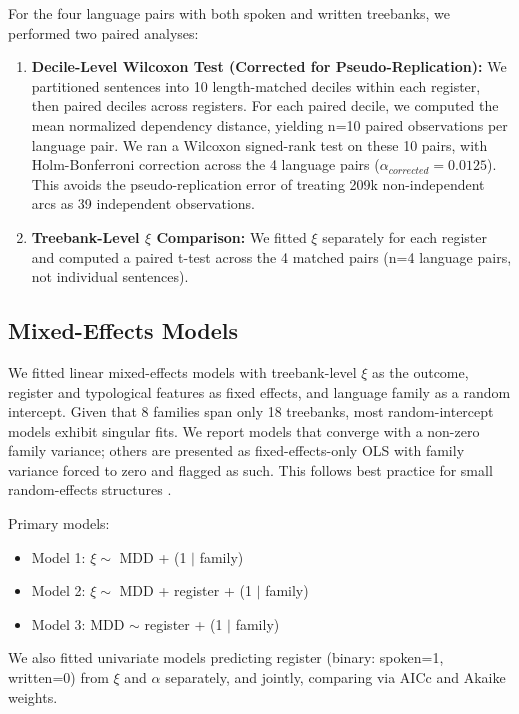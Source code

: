 \documentclass[11pt,letterpaper]{article}
\begin{document}
For the four language pairs with both spoken and written treebanks, we performed two paired analyses:

\begin{enumerate}
\item \textbf{Decile-Level Wilcoxon Test (Corrected for Pseudo-Replication):} We partitioned sentences into 10 length-matched deciles within each register, then paired deciles across registers. For each paired decile, we computed the mean normalized dependency distance, yielding n=10 paired observations per language pair. We ran a Wilcoxon signed-rank test on these 10 pairs, with Holm-Bonferroni correction across the 4 language pairs ($\alpha_{corrected}=0.0125$). This avoids the pseudo-replication error of treating 209k non-independent arcs as 39 independent observations.
\item \textbf{Treebank-Level $\xi$ Comparison:} We fitted $\xi$ separately for each register and computed a paired t-test across the 4 matched pairs (n=4 language pairs, not individual sentences).
\end{enumerate}

\subsection{Mixed-Effects Models}

We fitted linear mixed-effects models with treebank-level $\xi$ as the outcome, register and typological features as fixed effects, and language family as a random intercept. Given that 8 families span only 18 treebanks, most random-intercept models exhibit singular fits. We report models that converge with a non-zero family variance; others are presented as fixed-effects-only OLS with family variance forced to zero and flagged as such. This follows best practice for small random-effects structures \citep{Bates2018}.

Primary models:
\begin{itemize}
\item Model 1: $\xi \sim$ MDD + (1 $|$ family)
\item Model 2: $\xi \sim$ MDD + register + (1 $|$ family)
\item Model 3: MDD $\sim$ register + (1 $|$ family)
\end{itemize}

We also fitted univariate models predicting register (binary: spoken=1, written=0) from $\xi$ and $\alpha$ separately, and jointly, comparing via AICc and Akaike weights.
\end{document}
